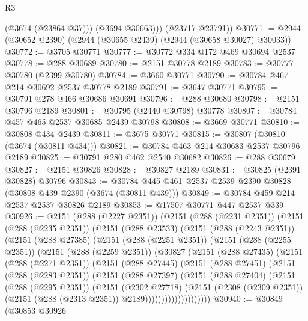 \begin{lexlean}{R3}
\begin{coremodule}
            (@3674 (@23864 @37)))
          (@3694 @30663)))
      (@23717 @23791))
@30771 := @2944 (@30652 @2390) (@2944 (@30655 @2439) (@2944 (@30658 @30027) @30033))
@30772 := @3705 @30771
@30777 := @30772 @334 @172 @469 @30694 @2537
@30778 := @288 @30689
@30780 := @2151 @30778 @2189
@30783 := @30777 @30780 (@2399 @30780)
@30784 := @3660 @30771
@30790 := @30784 @467 @214 @30692 @2537 @30778 @2189
@30791 := @3647 @30771
@30795 := @30791 @278 @466 @30686 @30691
@30796 := @288 @30680
@30798 := @2151 @30796 @2189
@30801 := @30795 (@2440 @30798) @30778
@30807 := @30784 @457 @465 @2537 @30685 @2439 @30798
@30808 := @3669 @30771
@30810 := @30808 @434 @2439
@30811 := @3675 @30771
@30815 := @30807 (@30810 (@3674 (@30811 @434)))
@30821 := @30784 @463 @214 @30683 @2537 @30796 @2189
@30825 := @30791 @280 @462 @2540 @30682
@30826 := @288 @30679
@30827 := @2151 @30826
@30828 := @30827 @2189
@30831 := @30825 (@2391 @30828) @30796
@30843 := @30784 @445 @461 @2537 @2539 @2390 @30828 (@30808 @439 @2390 (@3674 (@30811 @439)))
@30849 := @30784 @459 @214 @2537 @2537 @30826 @2189
@30853 := @17507 @30771 @447 @2537 @339
@30926 := @2151
    (@288 (@2227 @2351))
    (@2151
      (@288 (@2231 @2351))
      (@2151
        (@288 (@2235 @2351))
        (@2151
          (@288 @23533)
          (@2151
            (@288 (@2243 @2351))
            (@2151
              (@288 @27385)
              (@2151
                (@288 (@2251 @2351))
                (@2151
                  (@288 (@2255 @2351))
                  (@2151
                    (@288 (@2259 @2351))
                    (@30827
                      (@2151
                        (@288 @27435)
                        (@2151
                          (@288 (@2271 @2351))
                          (@2151
                            (@288 @27445)
                            (@2151
                              (@288 @27451)
                              (@2151
                                (@288 (@2283 @2351))
                                (@2151
                                  (@288 @27397)
                                  (@2151
                                    (@288 @27404)
                                    (@2151
                                      (@288 (@2295 @2351))
                                      (@2151
                                        (@2302 @27718)
                                        (@2151
                                          (@2308 (@2309 @2351))
                                          (@2151 (@288 (@2313 @2351)) @2189))))))))))))))))))))
@30940 := @30849
    (@30853
      @30926

\end{coremodule}
\end{lexlean}

